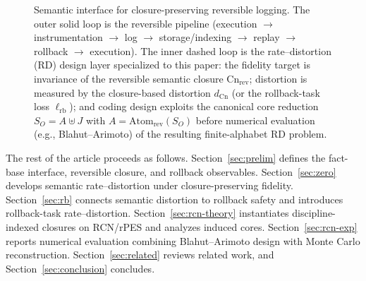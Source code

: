 \documentclass[twoside]{article}
\newcommand{\Cn}{\mathrm{Cn}}
\newcommand{\Atom}{\mathrm{Atom}}
\newcommand{\1}{\mathbf{1}}
\begin{document}
\begin{figure}[t]
{
}
\caption{Semantic interface for closure-preserving reversible logging.
The outer solid loop is the reversible pipeline (execution \(\rightarrow\) instrumentation \(\rightarrow\) log \(\rightarrow\) storage/indexing \(\rightarrow\) replay \(\rightarrow\) rollback \(\rightarrow\) execution).
The inner dashed loop is the rate--distortion (RD) design layer specialized to this paper: the fidelity target is invariance of the reversible semantic closure \(\Cn_{\mathrm{rev}}\); distortion is measured by the closure-based distortion \(d_{\Cn}\) (or the rollback-task loss \(\ell_{\mathrm{rb}}\)); and coding design exploits the canonical core reduction \(S_O=A\uplus J\) with \(A=\Atom_{\mathrm{rev}}(S_O)\) before numerical evaluation (e.g., Blahut--Arimoto) of the resulting finite-alphabet RD problem.}
\label{fig:revcomp-rd-rect-loop}
\end{figure}

The rest of the article proceeds as follows.
Section~\ref{sec:prelim} defines the fact-base interface, reversible closure, and rollback observables.
Section~\ref{sec:zero} develops semantic rate--distortion under closure-preserving fidelity.
Section~\ref{sec:rb} connects semantic distortion to rollback safety and introduces rollback-task rate--distortion.
Section~\ref{sec:rcn-theory} instantiates discipline-indexed closures on RCN/rPES and analyzes induced cores.
Section~\ref{sec:rcn-exp} reports numerical evaluation combining Blahut--Arimoto design with Monte Carlo reconstruction.
Section~\ref{sec:related} reviews related work, and Section~\ref{sec:conclusion} concludes.
\end{document}
